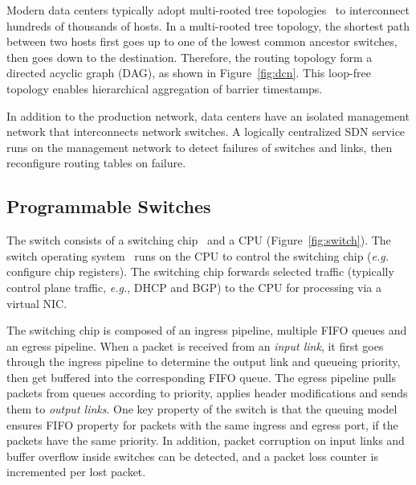 Modern data centers typically adopt multi-rooted tree topologies~\cite{leiserson1985fat,greenberg2009vl2} to interconnect hundreds of thousands of hosts. In a multi-rooted tree topology, the shortest path between two hosts first goes up to one of the lowest common ancestor switches, then goes down to the destination.
Therefore, the routing topology form a directed acyclic graph (DAG), as shown in Figure~\ref{fig:dcn}.
This loop-free topology enables hierarchical aggregation of barrier timestamps.

In addition to the production network, data centers have an isolated management network that interconnects network switches.
A logically centralized SDN service runs on the management network to detect failures of switches and links, then reconfigure routing tables on failure.


\subsection{Programmable Switches}
\label{sec:programmable-switches}
The switch consists of a switching chip~\cite{broadcom,tofino} and a CPU (Figure~\ref{fig:switch}). The switch operating system~\cite{arista-eos} runs on the CPU to control the switching chip (\textit{e.g.} configure chip registers). The switching chip forwards selected traffic (typically control plane traffic, \textit{e.g.}, DHCP and BGP) to the CPU for processing via a virtual NIC. 

The switching chip is composed of an ingress pipeline, multiple FIFO queues and an egress pipeline.
When a packet is received from an \textit{input link}, it first goes through the ingress pipeline to determine the output link and queueing priority, then get buffered into the corresponding FIFO queue.
The egress pipeline pulls packets from queues according to priority, applies header modifications and sends them to \textit{output links}.
One key property of the switch is that the queuing model ensures FIFO property for packets with the same ingress and egress port, 
if the packets have the same priority. In addition, packet corruption on input links and buffer overflow inside switches can be detected, and a packet loss counter is incremented per lost packet.

